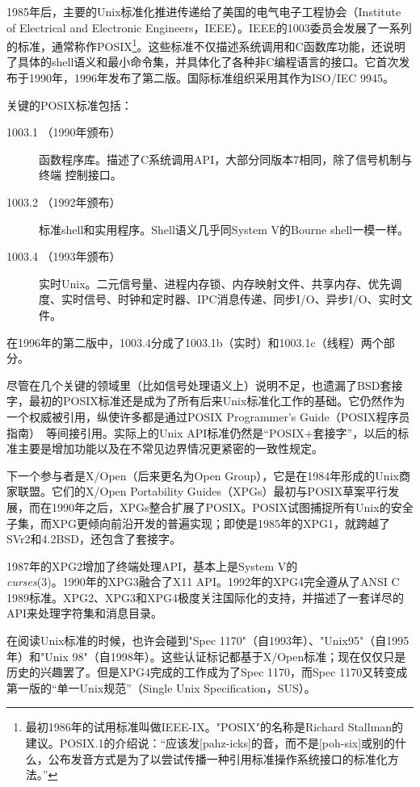 \documentclass[12pt,oneside]{ctexbook}
\begin{document}
\begin{common-format}
1985年后，主要的Unix标准化推进传递给了美国的电气电子工程协会（Institute of Electrical and Electronic Engineers，IEEE）。IEEE的1003委员会发展了一系列的标准，通常称作POSIX\footnote{最初1986年的试用标准叫做IEEE-IX。"POSIX"的名称是Richard Stallman的建议。POSIX.1的介绍说：“应该发[pahz-icks]的音，而不是[poh-six]或别的什么，公布发音方式是为了以尝试传播一种引用标准操作系统接口的标准化方法。”}。这些标准不仅描述系统调用和C函数库功能，还说明了具体的shell语义和最小命令集，并具体化了各种非C编程语言的接口。它首次发布于1990年，1996年发布了第二版。国际标准组织采用其作为ISO/IEC 9945。

关键的POSIX标准包括：
\begin{description}
\item[1003.1 （1990年颁布）] 函数程序库。描述了C系统调用API，大部分同版本7相同，除了信号机制与终端
控制接口。
\item[1003.2 （1992年颁布）] 标准shell和实用程序。Shell语义几乎同System V的Bourne shell一模一样。
\item[1003.4 （1993年颁布）] 实时Unix。二元信号量、进程内存锁、内存映射文件、共享内存、优先调度、实时信号、时钟和定时器、IPC消息传递、同步I/O、异步I/O、实时文件。
\end{description}

在1996年的第二版中，1003.4分成了1003.1b（实时）和1003.1c（线程）两个部分。

尽管在几个关键的领域里（比如信号处理语义上）说明不足，也遗漏了BSD套接字，最初的POSIX标准还是成为了所有后来Unix标准化工作的基础。它仍然作为一个权威被引用，纵使许多都是通过POSIX Programmer's Guide（POSIX程序员指南）~\cite{Lewine}等间接引用。实际上的Unix API标准仍然是“POSIX+套接字”，以后的标准主要是增加功能以及在不常见边界情况更紧密的一致性规定。

下一个参与者是X/Open（后来更名为Open Group），它是在1984年形成的Unix商家联盟。它们的X/Open Portability Guides（XPGs）最初与POSIX草案平行发展，而在1990年之后，XPGs整合扩展了POSIX。POSIX试图捕捉所有Unix的安全子集，而XPG更倾向前沿开发的普遍实现；即使是1985年的XPG1，就跨越了SVr2和4.2BSD，还包含了套接字。

1987年的XPG2增加了终端处理API，基本上是System V的\\ \textit{curses}(3)。1990年的XPG3融合了X11 API。1992年的XPG4完全遵从了ANSI C 1989标准。XPG2、XPG3和XPG4极度关注国际化的支持，并描述了一套详尽的API来处理字符集和消息目录。

在阅读Unix标准的时候，也许会碰到"Spec 1170"（自1993年）、"Unix95"（自1995年）和"Unix 98"（自1998年）。这些认证标记都基于X/Open标准；现在仅仅只是历史的兴趣罢了。但是XPG4完成的工作成为了Spec 1170，而Spec 1170又转变成第一版的“单一Unix规范”（Single Unix Specification，SUS）。


\end{common-format}
\end{document}
